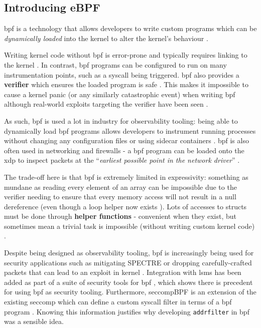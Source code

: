 \subsection{Introducing eBPF}

\ac{bpf} is a technology that allows developers to write custom programs which
can be \textit{dynamically loaded} into the kernel to alter the kernel's
behaviour \cite{LEARNING_EBPF}. 

Writing kernel code without \ac{bpf} is error-prone and typically
requires linking to the kernel \cite{UNDERSTANDING_LINUX_KERNEL}. In contrast,
\ac{bpf} programs can be configured to run on many instrumentation points, such
as a syscall being triggered. \ac{bpf} also provides a \textbf{verifier} which ensures the  loaded program is safe \cite{LEARNING_EBPF}.
This makes it impossible to cause a kernel panic (or any similarly
catastrophic event) when writing \ac{bpf} although real-world exploits targeting the
verifier have been seen \cite{BPF_VERIFIER_EXPLOIT}. 

As such, \ac{bpf} is used a lot in industry for observability tooling: being able to
dynamically load \ac{bpf} programs allows developers to instrument running processes
without changing any configuration files or using sidecar containers \cite{SIDECAR}.
\ac{bpf} is also often used in networking and firewalls \cite{LINUX_NETWORKING_OBSERVABILITY} - a \ac{bpf} program can
be loaded onto the \ac{xdp} to inspect packets at the ``\textit{earliest possible
point in the network driver}'' \cite{CILIUM_BPF_XDP_INTRO}. 

The trade-off here is that \ac{bpf} is extremely limited in expressivity:
something as mundane as reading every element of an array can be impossible due
to the verifier needing to ensure that every memory access will not result in 
a null dereference (even though a loop helper now exists \cite{BPF_LOOP_COMMIT}). Lots of accesses to structs must be done through
\textbf{helper functions} - convenient when they exist, but sometimes mean a
trivial task is impossible (without writing custom kernel code) \cite{bpf_kfuncs_docs}.

Despite being designed as observability tooling, \ac{bpf} is increasingly being
used for security applications such as mitigating SPECTRE
\cite{SPECTRE_BPF_MITIGATION} or dropping carefully-crafted packets that can
lead to an exploit in kernel \cite{BPF_PACKET_MITIGATION}. Integration with
\acp{lsm} has been added as part of a suite of security tools for \ac{bpf}
\cite{StarovoitovBPFSecurity}, which
shows there is precedent for using \ac{bpf} as security tooling. Furthermore,
seccompBPF is an extension of the existing seccomp which can define a custom
syscall filter in terms of a \ac{bpf} program \cite{seccompBPF}. Knowing this information
justifies why developing \texttt{addrfilter} in \ac{bpf} was a sensible idea.

